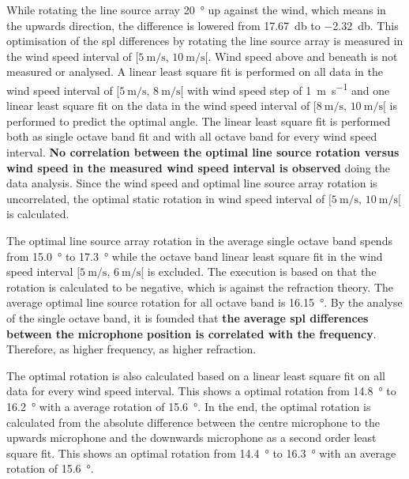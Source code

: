 While rotating the line source array \SI{20}{\degree} up against the wind, which means in the upwards direction, the difference is lowered from \SI{17.67}{\decibel}  to \SI{-2.32}{\decibel}. This optimisation of the \gls{spl} differences by rotating the line source array is measured in the wind speed interval of $[\SI{5}{\meter\per\second},\, \SI{10}{\meter\per\second}[ $. Wind speed above and beneath is not measured or analysed. A linear least square fit is performed on all data in the wind speed interval of $[\SI{5}{\meter\per\second},\, \SI{8}{\meter\per\second}[ $ with wind speed step of \SI{1}{\meter\per\second} and one linear least square fit on the data in the wind speed interval of $[\SI{8}{\meter\per\second},\, \SI{10}{\meter\per\second}[ $ is performed to predict the optimal angle. The linear least square fit is performed both as single octave band fit and with all octave band for every wind speed interval. \textbf{No correlation between the optimal line source rotation versus wind speed in the measured wind speed interval is observed} doing the data analysis. Since the wind speed and optimal line source array rotation is uncorrelated, the optimal static rotation in wind speed interval of $[\SI{5}{\meter\per\second},\, \SI{10}{\meter\per\second}[ $ is calculated.

The optimal line source array rotation in the average single octave band spends from \SI{15.0}{\degree} to \SI{17.3}{\degree} while the  octave band linear least square fit in the wind speed interval  $[\SI{5}{\meter\per\second},\, \SI{6}{\meter\per\second}[ $  is excluded. The execution is based on that the rotation is calculated to be negative, which is against the refraction theory. The average optimal line source rotation for all octave band is \SI{16.15}{\degree}. By the analyse of the single octave band, it is founded that \textbf{the average \gls{spl} differences between the microphone position is correlated with the frequency}. Therefore, as higher frequency, as higher refraction.


The optimal rotation is also calculated based on a linear least square fit on all data for every wind speed interval. This shows a optimal rotation from \SI{14.8}{\degree} to \SI{16.2}{\degree} with a average rotation of \SI{15.6}{\degree}. In the end, the optimal rotation is calculated from the absolute difference between the centre microphone to the upwards microphone and the downwards microphone as a second order least square fit. This shows an optimal rotation from \SI{14.4}{\degree} to \SI{16.3}{\degree} with an average rotation of \SI{15.6}{\degree}. 

